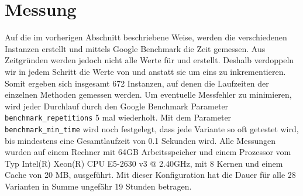 \section{Messung}
Auf die im vorherigen Abschnitt beschriebene Weise, werden die verschiedenen Instanzen erstellt und
mittels Google Benchmark die Zeit gemessen. Aus Zeitgründen werden jedoch nicht alle Werte 
für \la{} und \sm{} erstellt. Deshalb verdoppeln wir in jedem Schritt die Werte von \la{} und \sm{}
anstatt sie um eins zu inkrementieren. Somit ergeben sich insgesamt 672 Instanzen, auf denen die Laufzeiten der 
einzelnen Methoden gemessen werden. Um eventuelle Messfehler zu minimieren, wird
jeder Durchlauf durch den Google Benchmark Parameter \texttt{benchmark\_repetitions} 5 mal wiederholt.
Mit dem Parameter \texttt{benchmark\_min\_time} wird noch festgelegt, dass jede Variante so oft getestet
wird, bis mindestens eine Gesamtlaufzeit von 0.1 Sekunden  wird. 
Alle Messungen wurden auf einem Rechner mit 64GB Arbeitsspeicher und einem Prozessor vom Typ Intel(R) Xeon(R) CPU E5-2630 v3 @ 2.40GHz,
mit 8 Kernen und einem Cache von 20 MB, ausgeführt.
Mit dieser Konfiguration hat die Dauer für alle 28 Varianten in Summe ungefähr 19 Stunden betragen.





